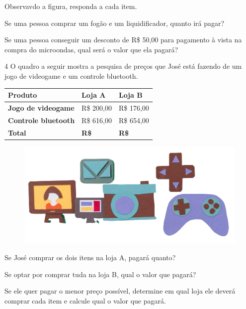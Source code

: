 \pagebreak

Observavdo a figura, responda a cada item.

\begin{escolha}
\item Se uma pessoa comprar um fogão e um liquidificador, quanto irá pagar?

\item Se uma pessoa conseguir um desconto de R\$ 50,00 para pagamento à
  vista na compra do microondas, qual será o valor que ela pagará?
\end{escolha}

\num{4} O quadro a seguir mostra a pesquisa de preços que José está fazendo
de um jogo de videogame e um controle bluetooth.

\begin{longtable}[]{@{}lll@{}}
\toprule
\hline
\textbf{Produto} & \textbf{Loja A} & \textbf{Loja B}\tabularnewline
\hline
\midrule
\endhead
\textbf{Jogo de videogame} & R\$ 200,00 & R\$ 176,00\tabularnewline
\hline
\textbf{Controle bluetooth} & R\$ 616,00 & R\$ 654,00\tabularnewline
\hline
\hline
\textbf{Total} & \textbf{R\$} & \textbf{R\$}\tabularnewline
\bottomrule
\end{longtable}

\begin{figure}[htpb!]
\centering
\includegraphics[width=.6\textwidth]{./media/image67a.png}
\end{figure}

\begin{escolha}
\item Se José comprar os dois itens na loja A, pagará quanto?

\item Se optar por comprar tuda na loja B, qual o valor que pagará?

\item Se ele quer pagar o menor preço possível, determine em qual loja ele
  deverá comprar cada item e calcule qual o valor que pagará.
\end{escolha}

